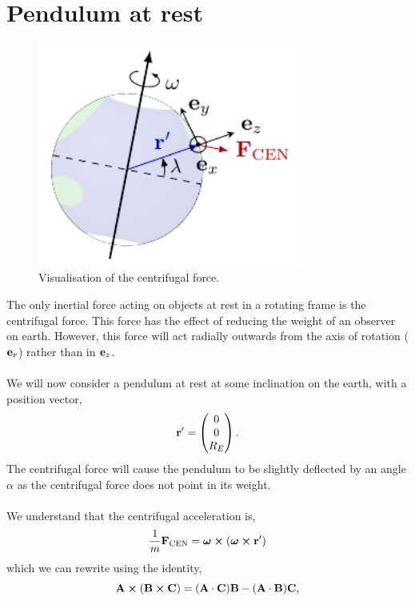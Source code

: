 \documentclass{book}
\begin{document}
\section{Pendulum at rest}
\begin{figure}[h]
    \centering
    \includegraphics[width=250pt]{document_ACDF_10245.pdf}
    \caption{Visualisation of the centrifugal force.}
    \label{fig:CF}
\end{figure}
\noindent
The only inertial force acting on objects at rest in a rotating frame is the centrifugal force. This force has the effect of reducing the weight of an observer on earth. However,  this force will act radially outwards from the axis of rotation ($\vb{e}_r$) rather than in $\vb{e}_z$.  \\\\
We will now consider a pendulum at rest at some inclination on the earth, with a position vector,
\begin{equation}
    \vb{r}' = \begin{pmatrix}
        0 \\
        0 \\
        R_E
    \end{pmatrix}.
\end{equation} 
The centrifugal force will cause the pendulum to be slightly deflected by an angle $\alpha$ as the centrifugal force does not point in its weight.
\\\\
We understand that the centrifugal acceleration is,
\begin{equation}
    \frac{1}{m}\vb{F}_{\text{CEN}} = \vb*{\omega}\cross(\vb*{\omega}\cross\vb{r}')
\end{equation}
which we can rewrite using the identity,
\begin{equation}
    \vb{A}\cross(\vb{B}\cross\vb{C}) = (\vb{A}\cdot\vb{C})\vb{B} - (\vb{A}\cdot\vb{B})\vb{C},
\end{equation}
\end{document}
